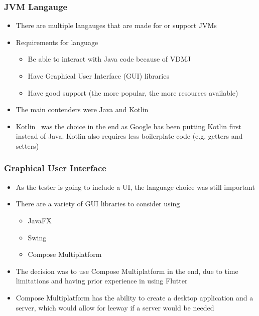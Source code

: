\documentclass[../dissertation.tex]{subfiles}
\begin{document}
\subsubsection{JVM Langauge}
\begin{itemize}
  \item There are multiple langauges that are made for or support JVMs~\cite{jvm-alt-lang}
  \item Requirements for language
    \begin{itemize}
      \item Be able to interact with Java code because of VDMJ
      \item Have Graphical User Interface (GUI) libraries
      \item Have good support (the more popular, the more resources available)
    \end{itemize}
  \item The main contenders were Java and Kotlin~\cite{kotlin}
  \item Kotlin~\cite{kotlin} was the choice in the end as Google has been putting Kotlin first
    instead of Java. Kotlin also requires less boilerplate code (e.g. getters and setters)~\cite{android-kotlin}

\end{itemize}

\subsubsection{Graphical User Interface}
\begin{itemize}
  \item As the tester is going to include a UI, the language choice was still important
    \item There are a variety of GUI libraries to consider using
    \begin{itemize}
      \item JavaFX~\cite{javafx}
      \item Swing~\cite{flatlaf}
      \item Compose Multiplatform~\cite{compose}
    \end{itemize}
  \item The decision was to use Compose Multiplatform in the end, due to time limitations and
    having prior experience in using Flutter~\cite{flutter}
  \item Compose Multiplatform has the ability to create a desktop application and a server,
    which would allow for leeway if a server would be needed
\end{itemize}
\end{document}
